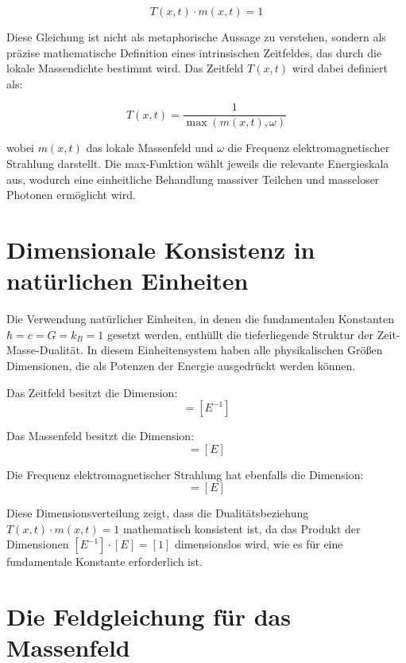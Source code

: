 \documentclass[12pt,a4paper]{report}
\begin{document}
	\begin{equation}
		T(x,t) \cdot m(x,t) = 1
	\end{equation}
	
	Diese Gleichung ist nicht als metaphorische Aussage zu verstehen, sondern als präzise mathematische Definition eines intrinsischen Zeitfeldes, das durch die lokale Massendichte bestimmt wird. Das Zeitfeld $T(x,t)$ wird dabei definiert als:
	
	\begin{equation}
		T(x,t) = \frac{1}{\max(m(x,t), \omega)}
	\end{equation}
	
	wobei $m(x,t)$ das lokale Massenfeld und $\omega$ die Frequenz elektromagnetischer Strahlung darstellt. Die max-Funktion wählt jeweils die relevante Energieskala aus, wodurch eine einheitliche Behandlung massiver Teilchen und masseloser Photonen ermöglicht wird.
	
	\section{Dimensionale Konsistenz in natürlichen Einheiten}
	
	Die Verwendung natürlicher Einheiten, in denen die fundamentalen Konstanten $\hbar = c = G = k_B = 1$ gesetzt werden, enthüllt die tieferliegende Struktur der Zeit-Masse-Dualität. In diesem Einheitensystem haben alle physikalischen Größen Dimensionen, die als Potenzen der Energie ausgedrückt werden können.
	
	Das Zeitfeld besitzt die Dimension:
	\begin{equation}
		[T] = [E^{-1}]
	\end{equation}
	
	Das Massenfeld besitzt die Dimension:
	\begin{equation}
		[m] = [E]
	\end{equation}
	
	Die Frequenz elektromagnetischer Strahlung hat ebenfalls die Dimension:
	\begin{equation}
		[\omega] = [E]
	\end{equation}
	
	Diese Dimensionsverteilung zeigt, dass die Dualitätsbeziehung $T(x,t) \cdot m(x,t) = 1$ mathematisch konsistent ist, da das Produkt der Dimensionen $[E^{-1}] \cdot [E] = [1]$ dimensionslos wird, wie es für eine fundamentale Konstante erforderlich ist.
	
	\section{Die Feldgleichung für das Massenfeld}
	
\end{document}
